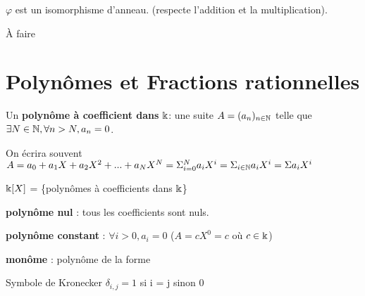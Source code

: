 \documentclass[a4paper, 12pt]{article}
\begin{document}










\begin{remark}
    $\varphi$ est un isomorphisme d'anneau. (respecte l'addition et la multiplication).
\end{remark}

\begin{methode}
    À faire
\end{methode}

\section{Polynômes et Fractions rationnelles}

\begin{definition}
    Un \textbf{polynôme à coefficient dans} $\Bbbk$: une suite $A = (a_n)_{n \in \mathbb{N}}$
    telle que $\exists N \in \mathbb{N}, \forall n > N, a_n = 0$.

    On écrira souvent $A = a_0 + a_1X + a_2X^2 + ... + a_NX^N = \Sigma_{i=0}^N a_iX^i = \Sigma_{i \in \mathbb{N}} a_iX^i = \Sigma a_iX^i$

    \item $\Bbbk[X]$ = \{polynômes à coefficients dans $\Bbbk$\}
    \item \textbf{polynôme nul} : tous les coefficients sont nuls.
    \item \textbf{polynôme constant} : $\forall i \gt 0, a_i = 0$ ($A = cX^0 = c$ où $c \in \Bbbk$)
    \item \textbf{monôme} : polynôme de la forme %
\end{definition}

Symbole de Kronecker $\delta_{i,j} = 1$ si i = j sinon 0

\end{document}
